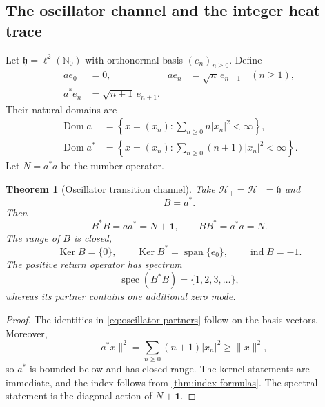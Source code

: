 \documentclass[11pt,reqno]{scrartcl}
\newcommand{\NN}{\mathbb N}
\newcommand{\scrHp}{\mathscr H_{+}}
\newcommand{\scrHm}{\mathscr H_{-}}
\newcommand{\idop}{\mathbf 1}
\DeclareMathOperator{\Dom}{Dom}
\DeclareMathOperator{\Ker}{Ker}
\DeclareMathOperator{\spec}{spec}
\DeclareMathOperator{\ind}{ind}
\theoremstyle{plain}
\newtheorem{theorem}{Theorem}[section]
\theoremstyle{definition}
\theoremstyle{remark}
\begin{document}
\subsection{The oscillator channel and the integer heat trace}

Let \(\mathfrak h=\ell^2(\NN_0)\) with orthonormal basis
\((e_n)_{n\ge0}\).  Define
\begin{align}
  ae_0&=0,
  &ae_n&=\sqrt n\,e_{n-1}\quad(n\ge1),
  \label{eq:annihilation-action}\\
  a^*e_n&=\sqrt{n+1}\,e_{n+1}.
  \label{eq:creation-action}
\end{align}
Their natural domains are
\begin{align}
  \Dom a
  &=\left\{x=(x_n):\sum_{n\ge0}n|x_n|^2<\infty\right\},
  \label{eq:annihilation-domain}\\
  \Dom a^*
  &=\left\{x=(x_n):\sum_{n\ge0}(n+1)|x_n|^2<\infty\right\}.
  \label{eq:creation-domain}
\end{align}
Let \(N=a^*a\) be the number operator.

\begin{theorem}[Oscillator transition channel]
\label{thm:oscillator-channel}
Take \(\scrHp=\scrHm=\mathfrak h\) and
\begin{equation}
  B=a^*.
  \label{eq:oscillator-B}
\end{equation}
Then
\begin{equation}
  B^*B=aa^*=N+\idop,
  \qquad
  BB^*=a^*a=N.
  \label{eq:oscillator-partners}
\end{equation}
The range of \(B\) is closed,
\begin{equation}
  \Ker B=\{0\},
  \qquad
  \Ker B^*=\operatorname{span}\{e_0\},
  \qquad
  \ind B=-1.
  \label{eq:oscillator-index}
\end{equation}
The positive return operator has spectrum
\begin{equation}
  \spec(B^*B)=\{1,2,3,\ldots\},
  \label{eq:positive-integer-spectrum}
\end{equation}
whereas its partner contains one additional zero mode.
\end{theorem}

\begin{proof}
The identities in \eqref{eq:oscillator-partners} follow on the basis vectors.
Moreover,
\begin{equation}
  \|a^*x\|^2
  =\sum_{n\ge0}(n+1)|x_n|^2
  \ge\|x\|^2,
\end{equation}
so \(a^*\) is bounded below and has closed range.  The kernel statements are
immediate, and the index follows from \cref{thm:index-formulas}.  The
spectral statement is the diagonal action of \(N+\idop\).
\end{proof}
\end{document}
